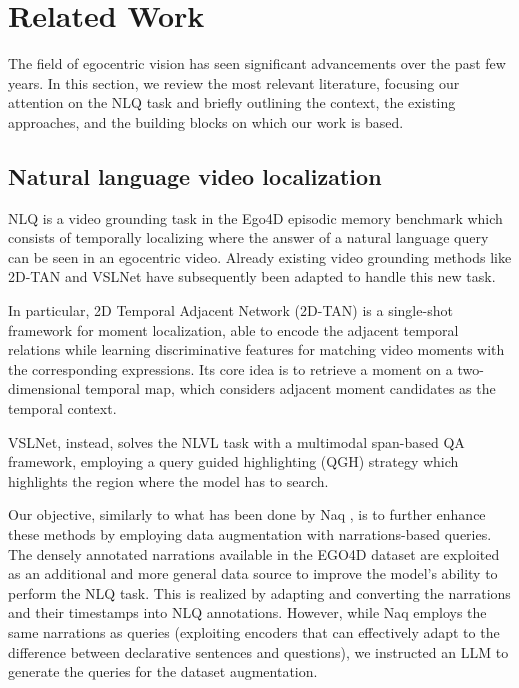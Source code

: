 \documentclass[10pt,twocolumn,letterpaper]{article}
\begin{document}
\section{Related Work}
The field of egocentric vision has seen significant advancements over the past few years. In this section, we review the most relevant literature, focusing our attention on the NLQ task and briefly outlining the context, the existing approaches, and the building blocks on which our work is based.
\subsection{Natural language video localization}
NLQ is a video grounding task in the Ego4D episodic memory benchmark which consists of temporally localizing where the answer of a natural language query can be seen in an egocentric video. 
Already existing video grounding methods like 2D-TAN \cite{zhang2020learning2dtemporaladjacent} and VSLNet \cite{zhang2020spanbasedlocalizingnetworknatural} have subsequently been adapted to handle this new task.

In particular, 2D Temporal Adjacent Network (2D-TAN) is a single-shot framework for moment localization, able to encode the adjacent temporal relations while learning discriminative features for matching video 
moments with the corresponding expressions. Its core idea is to retrieve a moment on a two-dimensional 
temporal map, which considers adjacent moment candidates as the temporal context.

VSLNet, instead, solves the NLVL task with a multimodal span-based QA framework, employing a query
guided highlighting (QGH) strategy which highlights the region where the model has to search.

Our objective, similarly to what has been done by Naq \cite{ramakrishnan2023naqleveragingnarrationsqueries}, is to further enhance these methods by 
employing data augmentation with narrations-based queries. The densely annotated narrations available in 
the EGO4D dataset are exploited as an additional and more general data source to improve the model’s 
ability to perform the NLQ task. This is realized by adapting and converting the narrations and their 
timestamps into NLQ annotations.  
However, while Naq employs the same narrations as queries (exploiting encoders that can effectively adapt 
to the difference between declarative sentences and questions), we instructed an LLM to generate the 
queries for the dataset augmentation.
\end{document}

